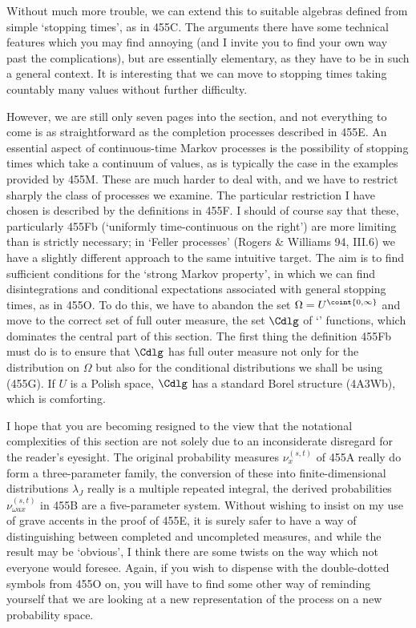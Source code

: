 {

\noindent Without much more trouble,
we can extend this to suitable algebras
defined from simple `stopping times', as in 455C.
The arguments there have
some technical features which you may find annoying (and I invite you to
find your own way past the complications),
but are essentially elementary, as they have to be in such a
general context.   It is interesting that we can move to stopping times
taking countably many values without further difficulty.

However, we are still only seven pages into the section, and not everything
to come is as straightforward as the completion processes described in
455E.   An essential aspect of continuous-time Markov processes is the
possibility of stopping times which take a continuum of values, as is
typically the case in the examples provided by 455M.   These are
much harder to deal with, and we have to restrict sharply the
class of processes we examine.
The particular restriction I have chosen is
described by the definitions in 455F.   I should of course say that these,
particularly 455Fb (`uniformly time-continuous on the right') are more
limiting than is strictly necessary;  in `Feller processes'
({\smc Rogers \& Williams 94}, III.6) we have a slightly different approach
to the same intuitive target.   The aim is to find sufficient conditions
for the `strong Markov property', in which we can find disintegrations and
conditional expectations associated with general stopping times, as in
455O.   To do this, we have to abandon the set
$\Omega=U^{\coint{0,\infty}}$ and move to the correct
set of full outer measure, the set $\Cdlg$ of `\cadlag' functions, which
dominates the central part of this section.   The first thing the
definition 455Fb must do is to ensure that $\Cdlg$ has full outer
measure not only for the distribution on $\Omega$ but also for the
conditional distributions we shall be using (455G).
If $U$ is a Polish space, $\Cdlg$ has a standard Borel structure (4A3Wb),
which is comforting.

I hope that you are becoming resigned to the view that the
notational complexities of this section are not
solely due to an inconsiderate disregard for the
reader's eyesight.   The original probability measures $\nu^{(s,t)}_x$
of 455A really do form a three-parameter family, the conversion of these
into finite-dimensional distributions $\lambda_J$ really is a multiple
repeated integral, the derived probabilities $\nu^{(s,t)}_{\omega ax}$
in 455B are
a five-parameter system.   Without wishing to insist on my use of
grave accents in the proof of 455E, it is surely safer to have a way of
distinguishing between completed and uncompleted measures, and while the
result may be `obvious', I think there are some twists on the way which not
everyone would foresee.   Again, if you wish to dispense with
the double-dotted symbols from 455O on, you will have to find some other
way of reminding yourself that we are looking at a new representation of
the process on a new probability space.

}
